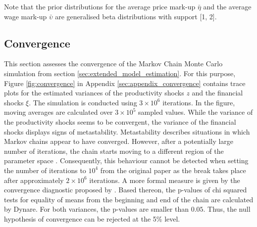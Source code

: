 Note that the prior distributions for the average price mark-up $\bar{\eta}$ and the average wage mark-up $\bar{\upsilon}$ are generalised beta distributions with support [1, 2].


\subsection{Convergence}
\label{sec:convergence}

This section assesses the convergence of the Markov Chain Monte Carlo simulation from section \ref{sec:extended_model_estimation}. For this purpose, Figure \ref{fig:convergence} in Appendix \ref{sec:appendix_convergence} contains trace plots for the estimated variances of the productivity shocks $z$ and the financial shocks $\xi$. The simulation is conducted using $3\times10^{6}$ iterations. In the figure, moving averages are calculated over $3\times10^{5}$ sampled values. While the variance of the productivity shocks seems to be convergent, the variance of the financial shocks displays signs of metastability. Metastability describes situations in which Markov chains appear to have converged. However, after a potentially large number of iterations, the chain starts moving to a different region of the parameter space \citep{PATILpymc}. Consequently, this behaviour cannot be detected when setting the number of iterations to $10^{4}$ from the original paper as the break takes place after approximately $2\times10^{6}$ iterations. A more formal measure is given by the convergence diagnostic proposed by \cite{GEWEKEevaluating}. Based thereon, the p-values of chi squared tests for equality of means from the beginning and end of the chain are calculated by Dynare. For both variances, the p-values are smaller than $0.05$. Thus, the null hypothesis of convergence can be rejected at the 5\% level.
